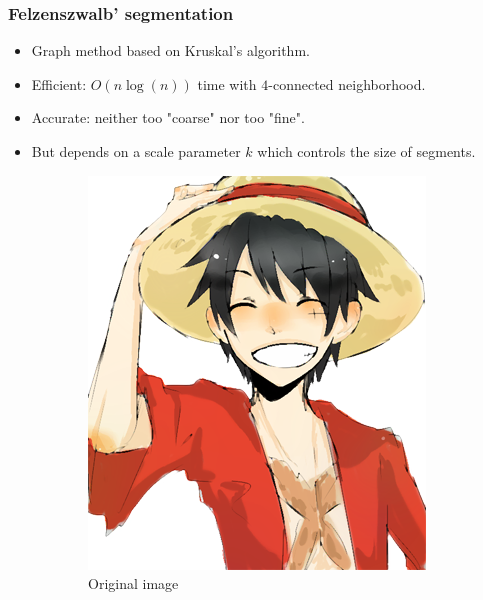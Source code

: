 \documentclass{beamer}
\begin{document}
\begin{frame}
\frametitle{Felzenszwalb' segmentation \cite{felzenszwalb2004efficient}}

\begin{itemize}
\item Graph method based on Kruskal's algorithm.
\item Efficient: $O(n\log(n))$ time with $4$-connected neighborhood.
\item Accurate: neither too "coarse" nor too "fine".
\item But depends on a scale parameter $k$ which controls the size of segments.
\end{itemize}

\begin{figure}[htb!]
\centering
\begin{subfigure}{.3\textwidth}
\includegraphics[width=\textwidth]{../images/rufy_d.png}
\caption{Original image}
\end{subfigure}
\begin{subfigure}{.3\textwidth}

\end{subfigure}
\end{figure}
\end{frame}
\end{document}
